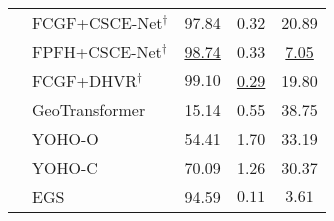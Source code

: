 \begin{table}[h]
\begin{tabular}{|c|l|c|c|c|}
    & FCGF+CSCE-Net$^{\dagger}$ \cite{CSCE-NET} & 97.84  & 0.32 & 20.89  \\
    & FPFH+CSCE-Net$^{\dagger}$ \cite{CSCE-NET} & \underline{98.74}  & 0.33  & \underline{7.05}  \\
    & FCGF+DHVR$^{\dagger}$ \cite{DHVR} & $\mathbf{99.10}$ & \underline{0.29} & 19.80 \\
    \cmidrule{2-5}
    & GeoTransformer \cite{geometric-transformer-for-fast-registration} & 15.14 & 0.55 & 38.75 \\
    & YOHO-O \cite{YOHO} & 54.41 & 1.70 & 33.19 \\
    & YOHO-C \cite{YOHO} & 70.09 & 1.26 & 30.37  \\
    \hline
    \multicolumn{1}{c|}{} & EGS  & 94.59 & $\mathbf{0.11}$ & $\mathbf{3.61}$ \\
    \cmidrule{2-5}
    \end{tabular}
    \label{tab:KITTI-results-60cm}
    \end{table}
